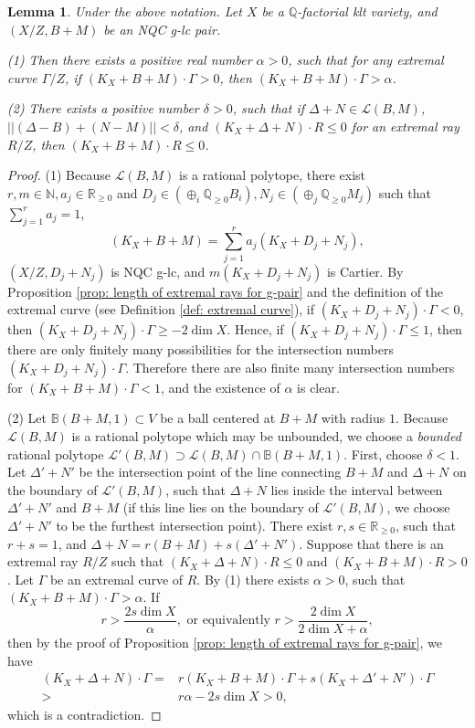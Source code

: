 \documentclass[11pt]{amsart}
\newcommand{\Rr}{\mathbb{R}}
\newcommand{\Qq}{\mathbb{Q}}
\newcommand{\Nn}{\mathbb{N}}
\newcommand{\Ll}{\mathcal{L}}
\newtheorem{lemma}[theorem]{Lemma}
\begin{document}
\begin{lemma}\label{lem:lengthbdd} Under the above notation. Let $X$ be a $\Qq$-factorial klt variety, and $(X/Z,B+M)$ be an NQC g-lc pair. 
	
	(1) Then there exists a positive real number $\alpha>0$, such that for any extremal curve $\Gamma$$/Z$, if $(K_X+B+M)\cdot \Gamma>0$, then $(K_X+B+M)\cdot \Gamma>\alpha$.
	
	(2) There exists a positive number $\delta>0$, such that if $\Delta+N\in \Ll(B,M)$, $||(\Delta-B)+(N-M)||<\delta$, and $(K_X+\Delta+N)\cdot R\le 0$ for an extremal ray $R/Z$, then $(K_X+B+M)\cdot R\le 0$. 
\end{lemma}
\begin{proof}(1) Because $\Ll(B, M)$ is a rational polytope, there exist $r,m \in \Nn, a_j \in \Rr_{\geq 0}$ and $D_j \in (\oplus_i \Qq_{\ge0} B_i), N_j \in (\oplus_j \Qq_{\ge0} M_j)$ such that $\sum_{j=1}^r a_j=1$, 
	\[
	(K_X+B+M)=\sum_{j=1}^r a_j(K_X+D_j+N_j),
	\]
	$(X/Z,D_j+N_j)$ is NQC g-lc, and $m(K_X+D_j+N_j)$ is Cartier. By Proposition \ref{prop: length of extremal rays for g-pair} and the definition of the extremal curve (see Definition \ref{def: extremal curve}), if $(K_X+D_j+N_j)\cdot \Gamma<0$, then $(K_X+D_j+N_j)\cdot \Gamma\ge -2\dim X$. Hence, if $(K_X+D_j+N_j)\cdot \Gamma\le 1$, then there are only finitely many possibilities for the intersection numbers $(K_X+D_j+N_j)\cdot \Gamma$. Therefore there are also finite many intersection numbers for $(K_X+B+M) \cdot \Gamma <1$, and the existence of $\alpha$ is clear.
	
	(2) Let $\mathbb B(B+M, 1) \subset V$ be a ball centered at $B+M$ with radius $1$. Because $\Ll(B,M)$ is a rational polytope which may be unbounded, we choose a \emph{bounded} rational polytope $\Ll'(B,M) \supset \Ll(B,M) \cap \mathbb B(B+M, 1)$. First, choose $\delta<1$. Let $\Delta'+N'$ be the intersection point of the line connecting $B+M$ and $\Delta+N$ on the boundary of $\Ll'(B,M)$, such that $\Delta+N$ lies inside the interval between $\Delta'+N'$ and $B+M$ (if this line lies on the boundary of $\Ll'(B,M)$, we choose $\Delta'+N'$ to be the furthest intersection point). There exist $r,s \in \Rr_{\geq 0}$, such that $r+s=1$, and $\Delta+N=r(B+M)+s(\Delta'+N')$. Suppose that there is an extremal ray $R/Z$ such that $(K_X+\Delta+N)\cdot R\le 0$ and $(K_X+B+M)\cdot R> 0$. Let $\Gamma$ be an extremal curve of $R$. By (1) there exists $\alpha>0$, such that $(K_X+B+M)\cdot \Gamma>\alpha$. If 
	\[
	r>\frac{2s\dim X}{\alpha}, \text{~or equivalently~} r>\frac{2\dim X}{2\dim X+\alpha},
	\] then by the proof of Proposition \ref{prop: length of extremal rays for g-pair}, we have
	\begin{align*}
	(K_X+\Delta+N)\cdot \Gamma=&r(K_X+B+M)\cdot \Gamma +s(K_X+\Delta'+N')\cdot\Gamma\\
	>&r\alpha-2s\dim X>0,
	\end{align*} which is a contradiction.
	

\end{proof}
\end{document}

